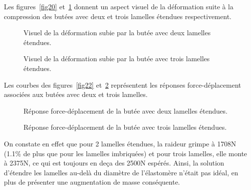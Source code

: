 ﻿\documentclass{article}
\begin{document}
Les figures~\ref{fig20} et~\ref{fig21} donnent un aspect visuel de la déformation suite à la compression des butées avec deux et trois lamelles étendues respectivement.

\begin{figure}[htbp]
	\begin{minipage}[c]{.45\linewidth}
	\begin{center}
	\caption{Visuel de la déformation subie par la butée avec deux lamelles étendues.}
	\label{fig20}
	\end{center}
	\end{minipage}
	\hfill
	\begin{minipage}[c]{.45\linewidth}
	\begin{center}
	\caption{Visuel de la déformation subie par la butée avec trois lamelles étendues.}
	\label{fig21}
	\end{center}
	\end{minipage}
\end{figure}

Les courbes des figures~\ref{fig22} et~\ref{fig23} représentent les réponses force-déplacement associées aux butées avec deux et trois lamelles.

\begin{figure}[htbp]
	\begin{minipage}[c]{.45\linewidth}
	\begin{center}
	\caption{Réponse force-déplacement de la butée avec deux lamelles étendues.}
	\label{fig22}
	\end{center}
	\end{minipage}
	\hfill
	\begin{minipage}[c]{.45\linewidth}
	\begin{center}
	\caption{Réponse force-déplacement de la butée avec trois lamelles étendues.}
	\label{fig23}
	\end{center}
	\end{minipage}
\end{figure}

On constate en effet que pour 2 lamelles étendues, la raideur grimpe à 1708N (1.1\% de plus que pour les lamelles imbriquées) et pour trois lamelles, elle monte à 2375N, ce qui est toujours en deça des 2500N espérés. Ainsi, la solution d'étendre les lamelles au-delà du diamètre de l'élastomère n'était pas idéal, en plus de présenter une augmentation de masse conséquente.
\end{document}
